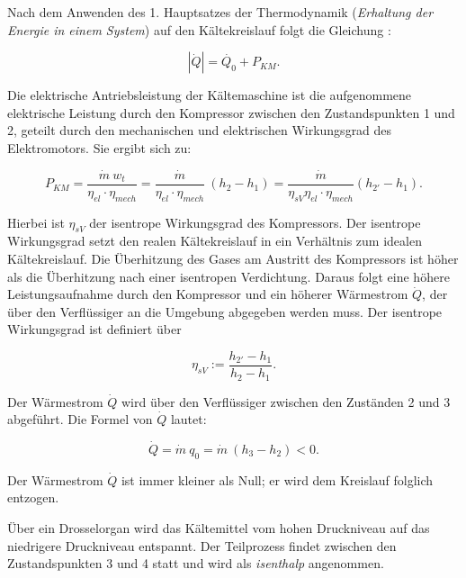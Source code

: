 Nach dem Anwenden des 1. Hauptsatzes der Thermodynamik (\textit{Erhaltung der Energie in einem System}) auf den Kältekreislauf folgt die Gleichung :

 \begin{equation}
 	|\dot{Q}|  = \dot{Q_0} +  P_{KM}.
 	\label{eq:Energiebilanz}
 \end{equation}
 
Die elektrische Antriebsleistung der Kältemaschine ist die aufgenommene elektrische Leistung durch den Kompressor zwischen den Zustandspunkten 1  und 2, geteilt durch den mechanischen und elektrischen Wirkungsgrad des Elektromotors. Sie ergibt sich zu:

\begin{equation}
P_{KM} = \frac{\dot{m}~ w_t}{\eta_{el} \cdot \eta_{mech}}= \frac{\dot{m}}{{\eta_{el} \cdot \eta_{mech}}}~ (h_2 - h_1) = \frac{\dot{m} }{\eta_{sV}\eta_{el} \cdot \eta_{mech}} (h_{2'}- h_1).
\label{eq:Antriebsleistung}
\end{equation}

Hierbei ist $\eta_{sV}$ der isentrope Wirkungsgrad des Kompressors. Der isentrope Wirkungsgrad setzt den realen Kältekreislauf in ein Verhältnis zum idealen Kältekreislauf. Die Überhitzung des Gases am Austritt des Kompressors ist höher als die Überhitzung nach einer isentropen Verdichtung. Daraus folgt eine höhere Leistungsaufnahme durch den Kompressor und ein höherer Wärmestrom $\dot{Q}$, der über den Verflüssiger an die Umgebung abgegeben werden muss. Der isentrope Wirkungsgrad ist definiert über 

\begin{equation}
\eta_{sV}:= \frac{h_{2'}- h_{1}}{h_2 - h_1}.
\label{eq:Antriebsleistung}
\end{equation}


Der Wärmestrom $\dot{Q}$ wird über den Verflüssiger zwischen den Zuständen 2 und 3 abgeführt. Die Formel von  $\dot{Q}$ lautet: 

\begin{equation}
	\dot{Q} = \dot{m}~q_0 = \dot{m}~ (h_3 - h_2)< 0.
	\label{eq:Wärmestrom}
\end{equation}

Der Wärmestrom $\dot{Q}$ ist immer kleiner als Null; er wird dem Kreislauf folglich entzogen.  
 
Über ein Drosselorgan wird das Kältemittel vom hohen Druckniveau auf das niedrigere Druckniveau entspannt. Der Teilprozess findet zwischen den Zustandspunkten 3 und 4 statt und wird als \textit{isenthalp} angenommen.  
 
